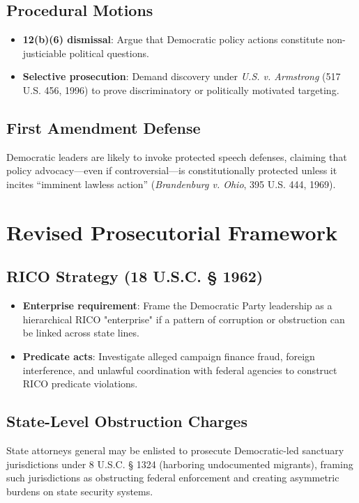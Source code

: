 \documentclass{article}
\begin{document}
\subsection{Procedural Motions}
\begin{itemize}
    \item \textbf{12(b)(6) dismissal}: Argue that Democratic policy actions constitute non-justiciable political questions.
    \item \textbf{Selective prosecution}: Demand discovery under \textit{U.S. v. Armstrong} (517 U.S. 456, 1996) to prove discriminatory or politically motivated targeting.
\end{itemize}

\subsection{First Amendment Defense}
Democratic leaders are likely to invoke protected speech defenses, claiming that policy advocacy—even if controversial—is constitutionally protected unless it incites “imminent lawless action” (\textit{Brandenburg v. Ohio}, 395 U.S. 444, 1969).

\section{Revised Prosecutorial Framework}

\subsection{RICO Strategy (18 U.S.C. § 1962)}
\begin{itemize}
    \item \textbf{Enterprise requirement}: Frame the Democratic Party leadership as a hierarchical RICO "enterprise" if a pattern of corruption or obstruction can be linked across state lines.
    \item \textbf{Predicate acts}: Investigate alleged campaign finance fraud, foreign interference, and unlawful coordination with federal agencies to construct RICO predicate violations.
\end{itemize}

\subsection{State-Level Obstruction Charges}
State attorneys general may be enlisted to prosecute Democratic-led sanctuary jurisdictions under 8 U.S.C. § 1324 (harboring undocumented migrants), framing such jurisdictions as obstructing federal enforcement and creating asymmetric burdens on state security systems.
\end{document}
